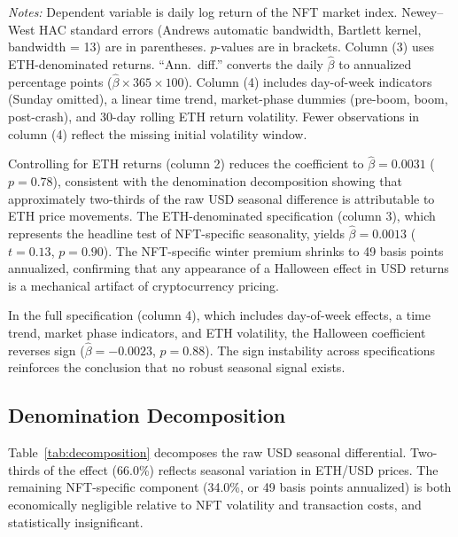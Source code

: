 \documentclass[12pt,a4paper]{article}
\begin{document}
\begin{table}[htbp]
\begin{threeparttable}
\begin{tablenotes}[flushleft]
\footnotesize
\item \textit{Notes:} Dependent variable is daily log return of the NFT market index. Newey--West HAC standard errors (Andrews automatic bandwidth, Bartlett kernel, bandwidth = 13) are in parentheses. $p$-values are in brackets. Column (3) uses ETH-denominated returns. ``Ann.\ diff.'' converts the daily $\hat{\beta}$ to annualized percentage points ($\hat{\beta} \times 365 \times 100$). Column (4) includes day-of-week indicators (Sunday omitted), a linear time trend, market-phase dummies (pre-boom, boom, post-crash), and 30-day rolling ETH return volatility. Fewer observations in column (4) reflect the missing initial volatility window.
\end{tablenotes}

\end{threeparttable}
\end{table}


Controlling for ETH returns (column 2) reduces the coefficient to $\hat{\beta} = 0.0031$ ($p = 0.78$), consistent with the denomination decomposition showing that approximately two-thirds of the raw USD seasonal difference is attributable to ETH price movements. The ETH-denominated specification (column 3), which represents the headline test of NFT-specific seasonality, yields $\hat{\beta} = 0.0013$ ($t = 0.13$, $p = 0.90$). The NFT-specific winter premium shrinks to 49 basis points annualized, confirming that any appearance of a Halloween effect in USD returns is a mechanical artifact of cryptocurrency pricing.

In the full specification (column 4), which includes day-of-week effects, a time trend, market phase indicators, and ETH volatility, the Halloween coefficient reverses sign ($\hat{\beta} = -0.0023$, $p = 0.88$). The sign instability across specifications reinforces the conclusion that no robust seasonal signal exists.

\subsection{Denomination Decomposition}

Table~\ref{tab:decomposition} decomposes the raw USD seasonal differential. Two-thirds of the effect (66.0\%) reflects seasonal variation in ETH/USD prices. The remaining NFT-specific component (34.0\%, or 49 basis points annualized) is both economically negligible relative to NFT volatility and transaction costs, and statistically insignificant.
\end{document}
